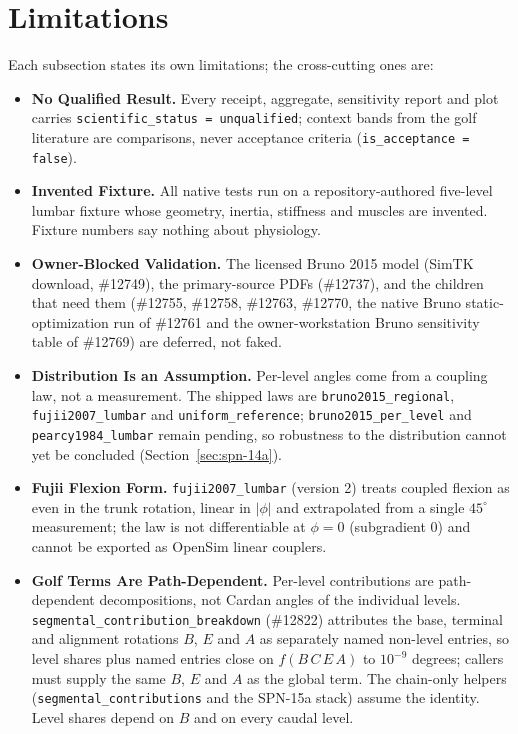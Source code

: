 \documentclass[11pt,a4paper]{article}
\begin{document}
\section{Limitations}
Each subsection states its own limitations; the cross-cutting ones are:
\begin{itemize}
  \item \textbf{No Qualified Result.} Every receipt, aggregate, sensitivity report and plot carries \texttt{scientific\_status = unqualified}; context bands from the golf literature are comparisons, never acceptance criteria (\texttt{is\_acceptance = false}).
  \item \textbf{Invented Fixture.} All native tests run on a repository-authored five-level lumbar fixture whose geometry, inertia, stiffness and muscles are invented. Fixture numbers say nothing about physiology.
  \item \textbf{Owner-Blocked Validation.} The licensed Bruno 2015 model (SimTK download, \#12749), the primary-source PDFs (\#12737), and the children that need them (\#12755, \#12758, \#12763, \#12770, the native Bruno static-optimization run of \#12761 and the owner-workstation Bruno sensitivity table of \#12769) are deferred, not faked.
  \item \textbf{Distribution Is an Assumption.} Per-level angles come from a coupling law, not a measurement. The shipped laws are \texttt{bruno2015\_regional}, \texttt{fujii2007\_lumbar} and \texttt{uniform\_reference}; \texttt{bruno2015\_per\_level} and \texttt{pearcy1984\_lumbar} remain pending, so robustness to the distribution cannot yet be concluded (Section~\ref{sec:spn-14a}).
  \item \textbf{Fujii Flexion Form.} \texttt{fujii2007\_lumbar} (version 2) treats coupled flexion as even in the trunk rotation, linear in $|\phi|$ and extrapolated from a single $45^\circ$ measurement; the law is not differentiable at $\phi=0$ (subgradient 0) and cannot be exported as OpenSim linear couplers.
  \item \textbf{Golf Terms Are Path-Dependent.} Per-level contributions are path-dependent decompositions, not Cardan angles of the individual levels. \texttt{segmental\_contribution\_breakdown} (\#12822) attributes the base, terminal and alignment rotations $B$, $E$ and $A$ as separately named non-level entries, so level shares plus named entries close on $f(B\,C\,E\,A)$ to $10^{-9}$ degrees; callers must supply the same $B$, $E$ and $A$ as the global term. The chain-only helpers (\texttt{segmental\_contributions} and the SPN-15a stack) assume the identity. Level shares depend on $B$ and on every caudal level.

\end{itemize}
\end{document}
